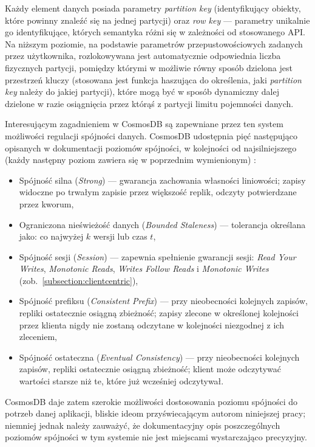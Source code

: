 Każdy element danych posiada parametry \textit{partition key} (identyfikujący obiekty, które powinny znaleźć się na jednej partycji) oraz \textit{row key} --- parametry unikalnie go identyfikujące, których semantyka różni się w zależności od stosowanego API. Na niższym poziomie, na podstawie parametrów przepustowościowych zadanych przez użytkownika, rozlokowywana jest automatycznie odpowiednia liczba fizycznych partycji, pomiędzy którymi w możliwie równy sposób dzielona jest przestrzeń kluczy (stosowana jest funkcja haszująca do określenia, jaki \textit{partition key} należy do jakiej partycji)\cite{cosmopart}, które mogą być w sposób dynamiczny dalej dzielone w razie osiągnięcia przez którąś z partycji limitu pojemności danych.

Interesującym zagadnieniem w CosmosDB są zapewniane przez ten system możliwości regulacji spójności danych. CosmosDB udostępnia pięć następująco opisanych w dokumentacji poziomów spójności, w kolejności od najsilniejszego (każdy następny poziom zawiera się w poprzednim wymienionym) \cite{cosmoscons}:
\begin{itemize}
    \item Spójność silna (\textit{Strong}) --- gwarancja zachowania własności liniowości; zapisy widoczne po trwałym zapisie przez większość replik, odczyty potwierdzane przez kworum,
    \item Ograniczona nieświeżość danych (\textit{Bounded Staleness}) --- tolerancja określana jako: co najwyżej $k$ wersji lub czas $t$,
    \item Spójność sesji (\textit{Session}) --- zapewnia spełnienie gwarancji sesji: \textit{Read
        Your Writes}, \textit{Monotonic Reads}, \textit{Writes Follow Reads} i \textit{Monotonic
        Writes} (zob.\ \ref{subsection:clientcentric}),
    \item Spójność prefiksu (\textit{Consistent Prefix}) --- przy nieobecności kolejnych zapisów, repliki ostatecznie osiągną zbieżność; zapisy zlecone w określonej kolejności przez klienta nigdy nie zostaną odczytane w kolejności niezgodnej z ich zleceniem,
    \item Spójność ostateczna (\textit{Eventual Consistency}) --- przy nieobecności kolejnych zapisów, repliki ostatecznie osiągną zbieżność; klient może odczytywać wartości starsze niż te, które już wcześniej odczytywał.
\end{itemize}

CosmosDB daje zatem szerokie możliwości dostosowania poziomu spójności do potrzeb danej aplikacji, bliskie ideom przyświecającym autorom niniejszej pracy; niemniej jednak należy zauważyć, że dokumentacyjny opis poszczególnych poziomów spójności w tym systemie nie jest miejscami wystarczająco precyzyjny.





